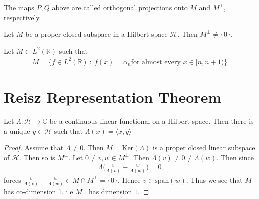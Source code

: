 \begin{definition}
  The maps $P, Q$ above are called orthogonal projections onto $M$
  and $M^\perp$, respectively.
\end{definition}

\begin{corollary}
  Let $M$ be a proper closed subspace in a Hilbert space
  $\mathcal{H}$. Then $M^\perp \neq \{ 0\}$.
\end{corollary}

\begin{exercise}
  Let $M \subset L^2(\mathbb{R})$ such that
  \begin{align*}
    M = \{ f \in L^2(\mathbb{R})  \ : \  f(x) = \alpha_n  \textrm{
    for almost every } x \in [n, n+1) \}
  \end{align*}
\end{exercise}

\section{Reisz Representation Theorem}

\begin{theorem}
  Let $\Lambda: \mathcal{H} \to \mathbb{C}$ be a continuous linear
  functional on a Hilbert space. Then there is a unique $y \in
  \mathcal{H}$ such that $\Lambda(x) = \langle x , y \rangle $
\end{theorem}
\begin{proof}
  Assume that $\Lambda \neq 0$. Then $M = \textrm{Ker}(\Lambda)$ is a proper
  closed linear subspace of $\mathcal{H}$. Then so is $M^\perp$. Let
  $0 \neq v, w \in M^\perp$. Then $\Lambda(v) \neq 0 \neq
  \Lambda(w)$. Then since
  \begin{align*}
    \Lambda \Big( \frac{v}{\Lambda(v)} - \frac{w}{\Lambda(w)} \Big) = 0
  \end{align*}
  forces $\frac{v}{\Lambda(v)} - \frac{w}{\Lambda(w)} \in M \cap
  M^\perp = \{ 0 \}$. Hence $v \in \textrm{span}(w)$. Thus we see
  that $M$ has co-dimension 1. i.e $M^\perp$ has dimension $1$.
\end{proof}


